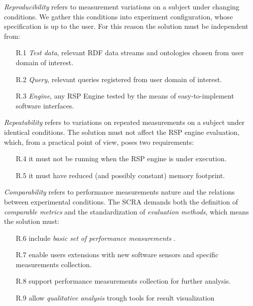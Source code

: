 \textit{Reproducibility} refers to measurement variations on a subject under changing conditions. We gather this conditions into experiment configuration, whose specification is up to the user. For this reason the solution must be independent from:
\begin{enumerate}
\item[R.1] \textit{Test data}, relevant RDF data streams and ontologies chosen from user domain of interest. %
\item[R.2] \textit{Query}, relevant queries registered from user domain of interest.
\item[R.3] \textit{Engine}, any RSP Engine tested by the means of easy-to-implement software interfaces. 
\end{enumerate}

\textit{Repeatability} refers to variations on repeated measurements on a subject under identical conditions. The solution must not affect the RSP engine evaluation, which, from a practical point of view, poses two requirements:
\begin{enumerate}
\item[R.4] it must not be running when the RSP engine is under execution. %
\item[R.5] it must have reduced (and possibly constant) memory footprint. %
\end{enumerate}

\textit{Comparability} refers to performance measurements nature and the relations between experimental conditions. The SCRA demands both the definition of \textit{comparable metrics} and the standardization of \textit{evaluation methods}, which means the solution must:
\begin{enumerate}
\item[R.6] include \textit{basic set of performance measurements} \cite{DBLP:conf/esws/ScharrenbachUMVB13}.
\item[R.7] enable users extensions with new software sensors and specific measurements collection.
\item[R.8] support performance measurements collection for further analysis.
\item[R.9] allow \textit{qualitative analysis} trough tools for result visualization
\end{enumerate}


